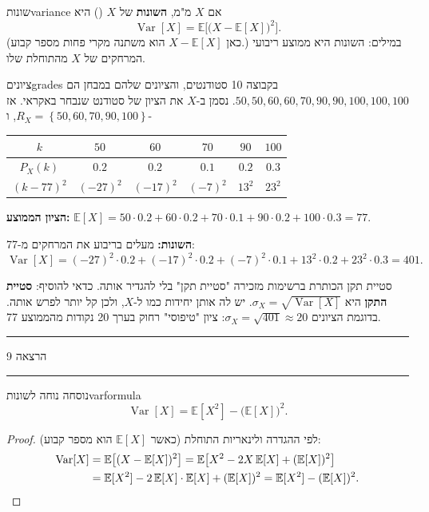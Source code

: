 \documentclass[11pt,a4paper]{report}
\newcommand{\flag}{\tikz[baseline=-0.1ex,x=0.9ex,y=0.9ex]{\draw[line width=0.5pt] (0,-0.3)--(0,1.6); \fill (0,1.6)--(1.2,1.2)--(0,0.8)--cycle;}}
\newcounter{todo}
\newcommand{\addtodo}[1]{\refstepcounter{todo}%
  \addcontentsline{tdo}{todo}{\protect\numberline{\thetodo}#1}}
\newcommand{\needcheck}[1]{\addtodo{#1}%
  {\color{todoc}\sffamily\small\,[\textbf{\flag{}\,\thetodo\ לבדיקה:} #1]\,}}
\renewcommand{\needcheck}[1]{}
\newcommand{\set}[1]{\left\{#1\right\}}
\newcommand{\E}{\mathbb{E}}
\DeclareMathOperator{\Var}{Var}
\newcommand{\lecture}[1]{\par\medskip
  \begin{center}\color{exc}\sffamily\small
  \rule[0.5ex]{0.25\linewidth}{0.4pt}\quad הרצאה #1\quad\rule[0.5ex]{0.25\linewidth}{0.4pt}
  \end{center}\par}
\begin{document}
\begin{definition}{שונות}{variance}
אם $X$ מ"מ, \textbf{השונות} של $X$ () היא
\[
  \Var[X]=\E\Big[\big(X-\E[X]\big)^2\Big].
\]
(כאן $X-\E[X]$ הוא משתנה מקרי פחות מספר קבוע.) במילים: השונות היא ממוצע ריבועי המרחקים של $X$ מהתוחלת שלו.
\end{definition}

\begin{example}{ציונים}{grades}
בקבוצה 10 סטודנטים, והציונים שלהם במבחן הם $50,50,60,60,70,90,90,100,100,100$. נסמן ב-$X$ את הציון של סטודנט שנבחר באקראי. אז $R_X=\set{50,60,70,90,100}$, ו-
\begin{center}
\renewcommand{\arraystretch}{1.3}
\begin{tabular}{c|ccccc}
  $k$ & $50$ & $60$ & $70$ & $90$ & $100$\\ \hline
  $P_X(k)$ & $0.2$ & $0.2$ & $0.1$ & $0.2$ & $0.3$\\
  $(k-77)^2$ & $(-27)^2$ & $(-17)^2$ & $(-7)^2$ & $13^2$ & $23^2$
\end{tabular}
\end{center}
\textbf{הציון הממוצע:} $\E[X]=50\cdot0.2+60\cdot0.2+70\cdot0.1+90\cdot0.2+100\cdot0.3=77$.

\textbf{השונות:} מעלים בריבוע את המרחקים מ-77:
\[
  \Var[X]=(-27)^2\cdot0.2+(-17)^2\cdot0.2+(-7)^2\cdot0.1+13^2\cdot0.2+23^2\cdot0.3=401.
\]
\needcheck{ברשימות חישוב השונות נעצר באמצע; השלמתי ל-$401$ (ובדקתי גם לפי הנוסחה $\E[X^2]-(\E[X])^2=6330-5929$)}
\end{example}

\begin{suggestion}{סטיית תקן}
הכותרת ברשימות מזכירה "סטיית תקן" בלי להגדיר אותה. כדאי להוסיף: \textbf{סטיית התקן} היא $\sigma_X=\sqrt{\Var[X]}$. יש לה אותן יחידות כמו ל-$X$, ולכן קל יותר לפרש אותה. בדוגמת הציונים $\sigma_X=\sqrt{401}\approx20$: ציון "טיפוסי" רחוק בערך 20 נקודות מהממוצע 77.
\end{suggestion}

\lecture{9}

\begin{claim}{נוסחה נוחה לשונות}{varformula}
\[
  \Var[X]=\E[X^2]-\big(\E[X]\big)^2.
\]
\end{claim}
\begin{proof}
לפי ההגדרה ולינאריות התוחלת (כאשר $\E[X]$ הוא מספר קבוע):
\begin{align*}
  \Var[X]&=\E\big[(X-\E[X])^2\big]=\E\big[X^2-2X\,\E[X]+(\E[X])^2\big]\\
  &=\E[X^2]-2\,\E[X]\cdot\E[X]+(\E[X])^2=\E[X^2]-(\E[X])^2.\qedhere
\end{align*}
\end{proof}
\end{document}
